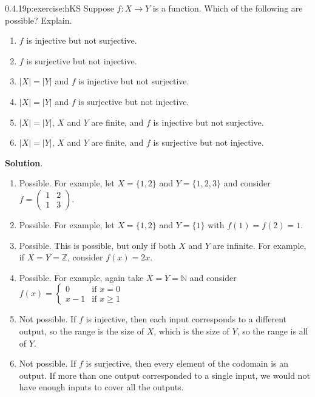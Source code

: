 \documentclass[twoside,11pt,]{book}
\newcommand{\blocktitlefont}{\relax}
\numberwithin{equation}{chapter}
\newcommand{\N}{\mathbb N}
\newcommand{\Z}{\mathbb Z}
\newcommand{\amp}{&}
\begin{document}
\begin{divisionsolution}{0.4.19}{}{p:exercise:hKS}%
Suppose \(f:X \to Y\) is a function. Which of the following are possible? Explain.%
\begin{enumerate}[label=(\alph*)]
\item{}\(f\) is injective but not surjective.%
\item{}\(f\) is surjective but not injective.%
\item{}\(|X| = |Y|\) and \(f\) is injective but not surjective.%
\item{}\(|X| = |Y|\) and \(f\) is surjective but not injective.%
\item{}\(|X| = |Y|\), \(X\) and \(Y\) are finite, and \(f\) is injective but not surjective.%
\item{}\(|X| = |Y|\), \(X\) and \(Y\) are finite, and \(f\) is surjective but not injective.%
\end{enumerate}
%
\par\smallskip%
\noindent\textbf{\blocktitlefont Solution}.\quad{}%
\begin{enumerate}[label=(\alph*)]
\item{}Possible. For example, let \(X=\{1,2\}\) and \(Y = \{1,2,3\}\) and consider \(f=\begin{pmatrix}1 \amp 2 \\ 1 \amp 3\end{pmatrix}\).%
\item{}Possible. For example, let \(X = \{1,2\}\) and \(Y = \{1\}\) with \(f(1) = f(2) = 1\).%
\item{}Possible. This is possible, but only if both \(X\) and \(Y\) are infinite. For example, if \(X = Y = \Z\), consider \(f(x) = 2x\).%
\item{}Possible. For example, again take \(X = Y = \N\) and consider \(f(x) = \begin{cases} 0 \amp \text{if } x = 0 \\ x-1 \amp \text{if } x \ge 1\end{cases}\)%
\item{}Not possible. If \(f\) is injective, then each input corresponds to a different output, so the range is the size of \(X\), which is the size of \(Y\), so the range is all of \(Y\).%
\item{}Not possible. If \(f\) is surjective, then every element of the codomain is an output. If more than one output corresponded to a single input, we would not have enough inputs to cover all the outputs.%
\end{enumerate}
%
\end{divisionsolution}%
\end{document}
